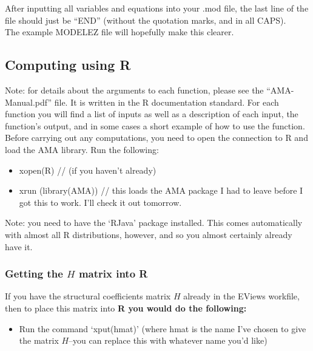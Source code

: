 \documentclass[11pt]{article}
\newcommand{\gc}[1]{{\color{blue} #1}}
\begin{document}
After inputting all variables and equations into your .mod file, the last line of the file should just be ``END'' (without the quotation marks, and in all CAPS). \\

The example MODELEZ file will hopefully make this clearer. \\

\subsection{Computing using R}
Note: for details about the arguments to each function, please see the ``AMA-Manual.pdf'' file.  It is written in the R documentation standard.  For each function you will find a list of inputs as well as a description of each input, the function's output, and in some cases a short example of how to use the function. \\

Before carrying out any computations, you need to open the connection to R and load the AMA library.  Run the following: \begin{itemize}
\item xopen(R) // (if you haven't already)
\item xrun (library(AMA)) // this loads the AMA package\gc{I had to leave before I got this to work. I'll check it out tomorrow.}
\end{itemize}
Note: you need to have the `RJava' package installed. This comes automatically with almost all R distributions, however, and so you almost certainly already have it.
\subsubsection{Getting the $H$ matrix into R}
If you have the structural coefficients matrix $H$ already in the EViews workfile, then to place this matrix into \bfseries R \normalfont you would do the following: \begin{itemize}
\item Run the command `xput(hmat)' (where hmat is the name I've chosen to give the matrix $H$--you can replace this with whatever name you'd like) 
\end{itemize}
\end{document}
